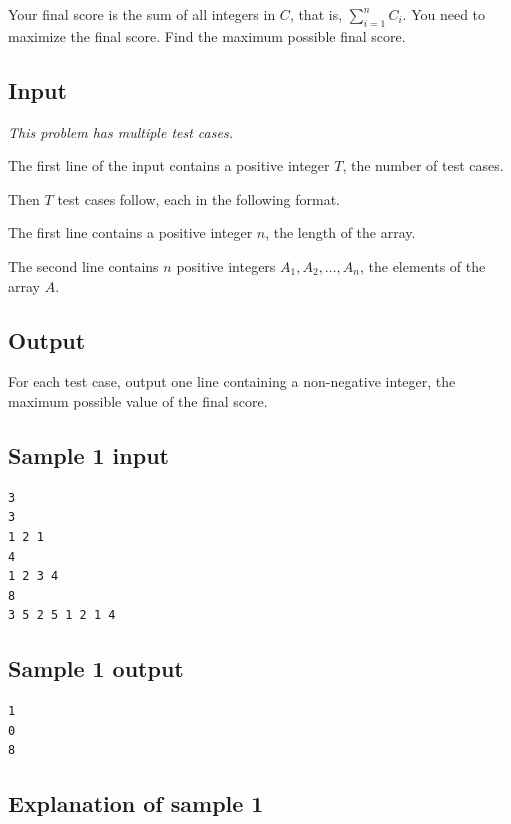 \documentclass[11pt]{article}
\begin{document}
Your final score is the sum of all integers in $C$, that is,
$\sum_{i=1}^{n} C_i$.
You need to maximize the final score.
Find the maximum possible final score.

\subsection*{Input}

\emph{This problem has multiple test cases.}

The first line of the input contains a positive integer $T$, the number of
test cases.

Then $T$ test cases follow, each in the following format.

The first line contains a positive integer $n$, the length of the array.

The second line contains $n$ positive integers $A_1, A_2, \ldots, A_n$,
the elements of the array $A$.

\subsection*{Output}

For each test case, output one line containing a non-negative integer, the
maximum possible value of the final score.

\subsection*{Sample 1 input}

\begin{verbatim}
3
3
1 2 1
4
1 2 3 4
8
3 5 2 5 1 2 1 4
\end{verbatim}

\subsection*{Sample 1 output}

\begin{verbatim}
1
0
8
\end{verbatim}

\subsection*{Explanation of sample 1}
\end{document}
